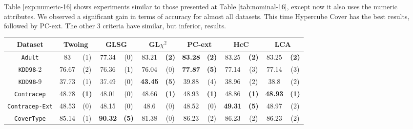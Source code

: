 Table \ref{exp:numeric-16} shows experiments  similar to those presented at Table \ref{tab:nominal-16}, except now it also uses the numeric attributes. We observed a significant gain in terms of accuracy for almost all datasets. This time Hypercube Cover has the best results, followed by PC-ext. The other 3 criteria have similar, but inferior, results.

\begin{table}
\small
\centering
\begin{tabular}{c|cc|cc|cc|cc|cc|cc} 
Dataset              &        \multicolumn{2}{c|}{Twoing} &   \multicolumn{2}{c|}{GLSG} &   \multicolumn{2}{c|}{GL$\chi^2$} & \multicolumn{2}{c|}{PC-ext}  & \multicolumn{2}{c|}{HcC}  & \multicolumn{2}{c}{LCA}  \\
\hline   
{\tt Adult}          &  83            &  (1)              &  77.34      &  (0)          &  83.21       &  {\bf (2)}         & {\bf 83.28} & {\bf (2)}      & 83.25        & {\bf (2)} & 83.25        & {\bf (2)} \\
{\tt KDD98}-2        &  76.67         &  (2)              &  76.36      &  (1)          &  76.04       &  (0)               & {\bf 77.87} & {\bf (5)}      & 77.14        & (3)       & 77.14        & (3)       \\
{\tt KDD98}-9        &  37.73         &  (1)              &  37.49      &  (0)          &  {\bf 43.45} &  {\bf (5)}         &  39.88      & (4)            & 38.96        & (2)       & 38.8         & (2)       \\
{\tt Contracep}      &  48.78         &  {\bf (1)}        &  48.01      &  (0)          &  48.66       &  {\bf (1)}         &  48.93      & {\bf (1)}      & 48.86        & {\bf (1)} & {\bf 48.93}  & {\bf (1)} \\
{\tt Contracep-Ext}  &  48.53         &  (0)              &  48.15      &  (0)          &  48.6        &  (0)               &  48.52      & (0)            & {\bf 49.31 } & {\bf (5)} & 48.97        & (2)       \\
{\tt CoverType}      &  85.14         &  (1)              &  {\bf 90.32}&  {\bf (5)}    &  81.38       &  (0)               &  86.23      & (2)            & 86.23        & (2)       & 86.23        & (2)       \\

\end{tabular}
\end{table}
